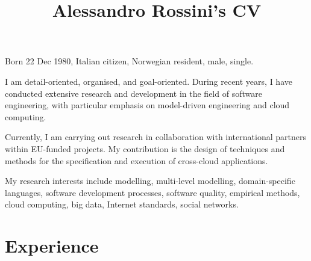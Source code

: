 \documentclass[a4paper,online]{adcv}
\title{Alessandro Rossini's CV}
\begin{document}

Born 22 Dec 1980, Italian citizen, Norwegian resident, male, single.

I am detail-oriented, organised, and goal-oriented. During recent years, I have conducted extensive research and development in the field of software engineering, with particular emphasis on model-driven engineering and cloud computing.

\ifextended
  Currently, I am carrying out research in collaboration with international partners within EU-funded projects. My contribution is the design of techniques and methods for the specification and execution of cross-cloud applications.

  My research interests include modelling, multi-level modelling, domain-specific languages, software development processes, software quality, empirical methods, cloud computing, big data, Internet standards, social networks.
\fi

\section{Experience}
\end{document}
